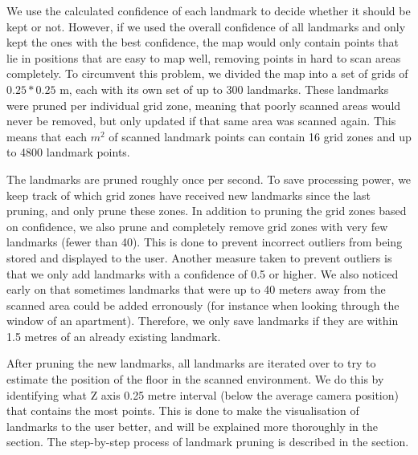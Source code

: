 \documentclass{article}
\begin{document}
We use the calculated confidence of each landmark to decide whether it should be kept or not. However, if we used the overall confidence of all landmarks and only kept the ones with the best confidence, the map would only contain points that lie in positions that are easy to map well, removing points in hard to scan areas completely. To circumvent this problem, we divided the map into a set of grids of $0.25 * 0.25$ m, each with its own set of up to 300 landmarks. These landmarks were pruned per individual grid zone, meaning that poorly scanned areas would never be removed, but only updated if that same area was scanned again. This means that each $m^2$ of scanned landmark points can contain 16 grid zones and up to 4800 landmark points.

The landmarks are pruned roughly once per second. To save processing power, we keep track of which grid zones have received new landmarks since the last pruning, and only prune these zones. In addition to pruning the grid zones based on confidence, we also prune and completely remove grid zones with very few landmarks (fewer than 40). This is done to prevent incorrect outliers from being stored and displayed to the user. Another measure taken to prevent outliers is that we only add landmarks with a confidence of 0.5 or higher. We also noticed early on that sometimes landmarks that were up to 40 meters away from the scanned area could be added erronously (for instance when looking through the window of an apartment). Therefore, we only save landmarks if they are within 1.5 metres of an already existing landmark.

After pruning the new landmarks, all landmarks are iterated over to try to estimate the position of the floor in the scanned environment. We do this by identifying what Z axis 0.25 metre interval (below the average camera position) that contains the most points. This is done to make the visualisation of landmarks to the user better, and will be explained more thoroughly in the  section. The step-by-step process of landmark pruning is described in the  section.
\end{document}
